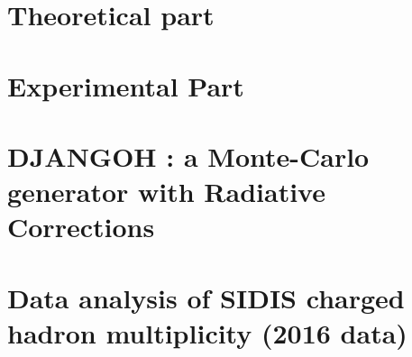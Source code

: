 
\pagestyle{scrheadings}

\part{Theoretical part} %


\cleardoublepage %


\part{Experimental Part} %


\cleardoublepage %


\part{DJANGOH : a Monte-Carlo generator with Radiative Corrections} %


\cleardoublepage %


\part{Data analysis of SIDIS charged hadron multiplicity (2016 data)} %



